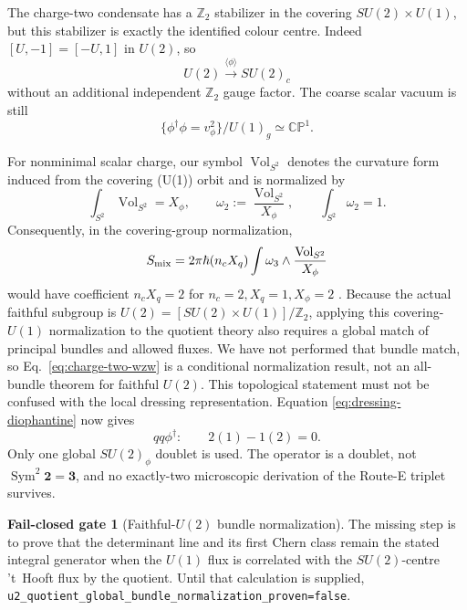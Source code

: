 \documentclass[11pt]{article}
\theoremstyle{definition}
\newtheorem{gate}[theorem]{Fail-closed gate}
\theoremstyle{remark}
\newcommand{\ZZ}{\mathbb Z}
\newcommand{\CP}{\mathbb {CP}}
\begin{document}
The charge-two condensate has a \(\ZZ_2\) stabilizer in the covering
\(SU(2)\times U(1)\), but this stabilizer is exactly the identified colour
centre.  Indeed \([U,-1]=[-U,1]\) in \(U(2)\), so
\begin{equation}
 U(2)\xrightarrow{\langle\phi\rangle}SU(2)_c
 \label{eq:second-breaking}
\end{equation}
without an additional independent \(\ZZ_2\) gauge factor.  The coarse scalar
vacuum is still
\begin{equation}
 \{\phi^\dagger\phi=v_\phi^2\}/U(1)_g\simeq\CP^1.
 \label{eq:charge-two-cp1}
\end{equation}

For nonminimal scalar charge, our symbol
\(\operatorname{Vol}_{S^2}\) denotes the curvature form induced from the
covering (U(1)) orbit and is normalized by
\begin{equation}
 \int_{S^2}\operatorname{Vol}_{S^2}=X_\phi,
 \qquad
 \omega_2:=\frac{\operatorname{Vol}_{S^2}}{X_\phi},
 \qquad \int_{S^2}\omega_2=1.
 \label{eq:nonminimal-s2-normalization}
\end{equation}
Consequently, in the covering-group normalization,
\begin{equation}
 S_{\rm mix}=2\pi\hbar(n_cX_q)
 \int\omega_3\wedge\frac{\operatorname{Vol}_{S^2}}{X_\phi}
 \label{eq:charge-two-wzw}
\end{equation}
would have coefficient \(n_cX_q=2\) for
\(n_c=2,X_q=1,X_\phi=2\)
\cite{DavighiLohitsiri2024Global}.  Because the actual faithful subgroup is
\(U(2)=[SU(2)\times U(1)]/\ZZ_2\), applying this covering-
\(U(1)\) normalization to the quotient theory also requires a global match
of principal bundles and allowed fluxes.  We have not performed that bundle
match, so Eq.~\eqref{eq:charge-two-wzw} is a conditional normalization result,
not an all-bundle theorem for faithful \(U(2)\).  This topological statement
must not be confused with the local dressing representation.  Equation
\eqref{eq:dressing-diophantine} now gives
\begin{equation}
 qq\phi^\dagger:\qquad 2(1)-1(2)=0.
 \label{eq:one-dressing}
\end{equation}
Only one global \(SU(2)_\phi\) doublet is used.  The operator is a doublet,
not \(\operatorname{Sym}^2\bm2=\bm3\), and no exactly-two microscopic
derivation of the Route-E triplet survives.

\begin{gate}[Faithful-\(U(2)\) bundle normalization]
The missing step is to prove that the determinant line and its first Chern
class remain the stated integral generator when the \(U(1)\) flux is
correlated with the \(SU(2)\)-centre 't~Hooft flux by the quotient.  Until
that calculation is supplied,
\texttt{u2\_quotient\_global\_bundle\_normalization\_proven=false}.
\end{gate}
\end{document}
